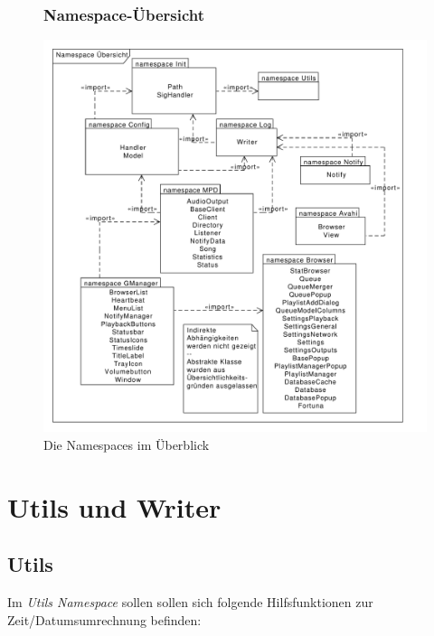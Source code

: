 
\newpage
\begin{figure}[thb!]
\subsubsection{Namespace-Übersicht}
    \centering
    \includegraphics[scale=0.50]{./gfx/class/package}
    \caption{Die Namespaces im Überblick}
    \label{dd_namespaces}
\end{figure}

\section{Utils und Writer} 

\subsection{Utils}
Im \emph{Utils Namespace} sollen sollen sich folgende Hilfsfunktionen zur Zeit/Datumsumrechnung befinden:

